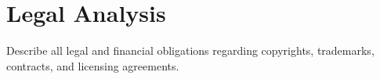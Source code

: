 \chapter{Legal Analysis}
Describe all legal and financial obligations regarding copyrights, trademarks, contracts, and licensing agreements.
